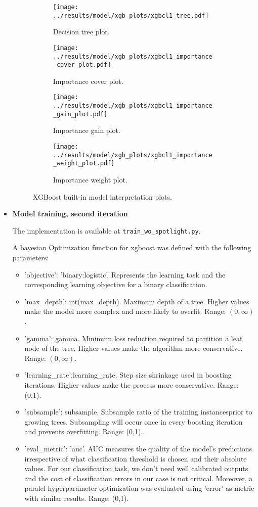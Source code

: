 \documentclass{article}
\begin{document}
\begin{itemize}
\begin{figure}
  \begin{subfigure}[a]{0.5\linewidth}
    \centering\texttt{[image: ../results/model/xgb\_plots/xgbcl1\_tree.pdf]}
    \caption{Decision tree plot.}
    \label{fig:tree_spot}
  \end{subfigure}
  \begin{subfigure}[b]{0.5\linewidth}
    \centering\texttt{[image: ../results/model/xgb\_plots/xgbcl1\_importance\_cover\_plot.pdf]}
    \caption{Importance cover plot.}
    \label{fig:cover_spot}
  \end{subfigure}
  \begin{subfigure}[c]{0.5\linewidth}
    \centering\texttt{[image: ../results/model/xgb\_plots/xgbcl1\_importance\_gain\_plot.pdf]}
    \caption{Importance gain plot.}
    \label{fig:gain_spot}
  \end{subfigure}
  \begin{subfigure}[d]{0.5\linewidth}
    \centering\texttt{[image: ../results/model/xgb\_plots/xgbcl1\_importance\_weight\_plot.pdf]}
    \caption{Importance weight plot.}
    \label{fig:weight_spot}
  \end{subfigure}
\caption{XGBoost built-in model interpretation plots.}
\label{fig:xgb_int_spot}
\end{figure}

\item \textbf{Model training, second iteration}

The implementation is available at {\tt train\_wo\_spotlight.py}.

A bayesian Optimization function for xgboost was defined with the following parameters:
\begin{itemize}
	\item 'objective': 'binary:logistic'. Represents the learning task and the corresponding learning objective for a binary classification.
	\item 'max\_depth': int(max\_depth). Maximum depth of a tree. Higher values make the model more complex and more likely to overfit. Range: $(0, \infty)$.
	\item 'gamma': gamma. Minimum loss reduction required to partition a leaf node of the tree. Higher values make the algorithm more conservative. Range: $(0, \infty)$.
	\item'learning\_rate':learning\_rate. Step size shrinkage used in boosting iterations. Higher values make the process more conservative. Range: (0,1).
	\item 'subsample': subsample. Subsample ratio of the training instancesprior to growing trees. Subsampling will occur once in every boosting iteration and prevents overfitting. Range: (0,1).
	\item 'eval\_metric': 'auc'. AUC measures the quality of the model's predictions irrespective of what classification threshold is chosen and their absolute values. For our classification task, we don't need well calibrated outputs and the cost of classification errors in our case is not critical. Moreover, a paralel hyperparameter optimization was evaluated using 'error' as metric with similar results. Range: (0,1).


\end{itemize}
\end{itemize}
\end{document}

